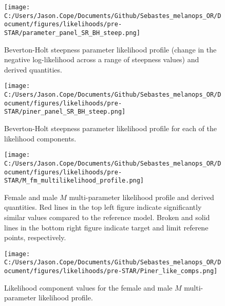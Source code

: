 \documentclass[11pt,
  letterpaper,
]{article}
\begin{document}
\newpage

\begin{figure}
{\centering
\texttt{[image: C:/Users/Jason.Cope/Documents/Github/Sebastes\_melanops\_OR/Document/figures/likelihoods/pre-STAR/parameter\_panel\_SR\_BH\_steep.png]}
}
\caption{Beverton-Holt steepness parameter likelihood profile (change in the negative log-likelihood across a range of steepness values) and derived quantities.\label{fig:steepness-profile}}
\end{figure}

\newpage

\begin{figure}
{\centering
\texttt{[image: C:/Users/Jason.Cope/Documents/Github/Sebastes\_melanops\_OR/Document/figures/likelihoods/pre-STAR/piner\_panel\_SR\_BH\_steep.png]}
}
\caption{Beverton-Holt steepness parameter likelihood profile for each of the likelihood components.\label{fig:steepness-profile-components}}
\end{figure}

\newpage

\begin{figure}
{\centering
\texttt{[image: C:/Users/Jason.Cope/Documents/Github/Sebastes\_melanops\_OR/Document/figures/likelihoods/pre-STAR/M\_fm\_multilikelihood\_profile.png]}
}
\caption{Female and male $M$ multi-parameter likelihood profile and derived quantities. Red lines in the top left figure indicate significantly similar values compared to the reference model. Broken and solid lines in the bottom right figure indicate target and limit referene points, respectively.\label{fig:M-multiprofile-combo}}
\end{figure}

\newpage

\begin{figure}
{\centering
\texttt{[image: C:/Users/Jason.Cope/Documents/Github/Sebastes\_melanops\_OR/Document/figures/likelihoods/pre-STAR/Piner\_like\_comps.png]}
}
\caption{Likelihood component values for the female and male $M$ multi-parameter likelihood profile.\label{fig:M-multiprofile-like-components}}
\end{figure}
\end{document}
